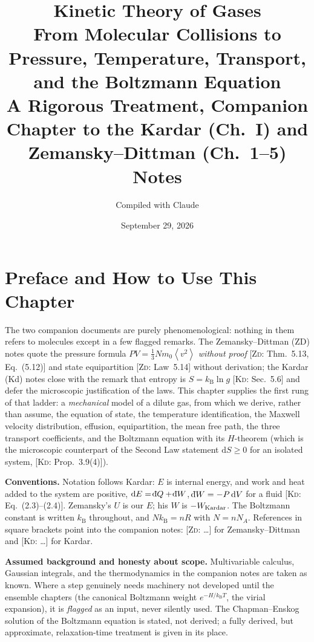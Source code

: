 \documentclass[11pt,a4paper]{report}
\title{\textbf{Kinetic Theory of Gases}\\[4pt]
\large From Molecular Collisions to Pressure, Temperature, Transport, and the Boltzmann Equation\\[4pt]
\normalsize A Rigorous Treatment, Companion Chapter to the Kardar (Ch.~I) and Zemansky--Dittman (Ch.~1--5) Notes}
\author{Compiled with Claude}
\date{September 29, 2026}
\theoremstyle{definition}
\theoremstyle{plain}
\newcommand{\KD}[1]{[\textsc{Kd}: #1]}   %
\newcommand{\ZD}[1]{[\textsc{Zd}: #1]}   %
\newcommand{\kB}{k_{\mathrm{B}}}
\newcommand{\dd}{\mathrm{d}}
\newcommand{\dbar}{\mathchar'26\mkern-12mu \dd}
\newcommand{\avg}[1]{\left\langle #1\right\rangle}
\begin{document}
\maketitle
\tableofcontents

\chapter*{Preface and How to Use This Chapter}

The two companion documents are purely phenomenological: nothing in them refers to molecules except in a few flagged remarks. The Zemansky--Dittman (ZD) notes quote the pressure formula $PV=\tfrac13 Nm_0\avg{v^2}$ \emph{without proof} \ZD{Thm.~5.13, Eq.~(5.12)} and state equipartition \ZD{Law~5.14} without derivation; the Kardar (Kd) notes close with the remark that entropy is $S=\kB\ln g$ \KD{Sec.~5.6} and defer the microscopic justification of the laws. This chapter supplies the first rung of that ladder: a \emph{mechanical} model of a dilute gas, from which we derive, rather than assume, the equation of state, the temperature identification, the Maxwell velocity distribution, effusion, equipartition, the mean free path, the three transport coefficients, and the Boltzmann equation with its $H$-theorem (which is the microscopic counterpart of the Second Law statement $\dd S\ge 0$ for an isolated system, \KD{Prop.~3.9(4)}).

\medskip
\noindent\textbf{Conventions.} Notation follows Kardar: $E$ is internal energy, and work and heat added to the system are positive, $\dd E=\dbar Q+\dbar W$, $\dbar W=-P\,\dd V$ for a fluid \KD{Eq.~(2.3)--(2.4)}. Zemansky's $U$ is our $E$; his $W$ is $-W_{\rm Kardar}$. The Boltzmann constant is written $\kB$ throughout, and $N\kB=n R$ with $N=nN_A$. References in square brackets point into the companion notes: \ZD{\dots} for Zemansky--Dittman and \KD{\dots} for Kardar.

\medskip
\noindent\textbf{Assumed background and honesty about scope.} Multivariable calculus, Gaussian integrals, and the thermodynamics in the companion notes are taken as known. Where a step genuinely needs machinery not developed until the ensemble chapters (the canonical Boltzmann weight $e^{-H/\kB T}$, the virial expansion), it is \emph{flagged} as an input, never silently used. The Chapman--Enskog solution of the Boltzmann equation is stated, not derived; a fully derived, but approximate, relaxation-time treatment is given in its place.
\end{document}
